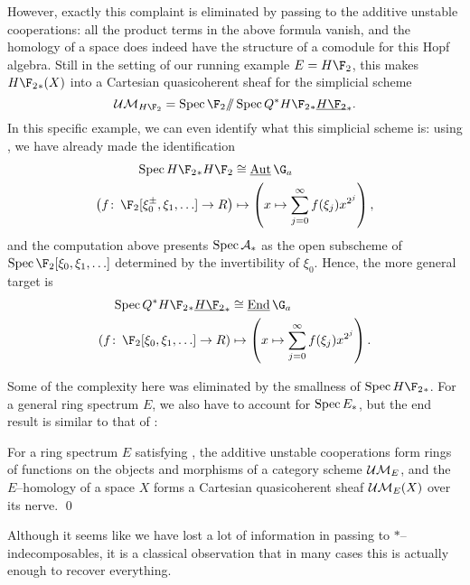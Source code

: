 However, exactly this complaint is eliminated by passing to the additive unstable cooperations: all the product terms in the above formula vanish, and the homology of a space does indeed have the structure of a comodule for this Hopf algebra.  Still in the setting of our running example $E = H\F_2$, this makes $H\F_2{}_*(X)$ into a Cartesian quasicoherent sheaf for the simplicial scheme \[\Ucontext{H\F_2} = \Spec \F_2 \mmod \Spec Q^* H\F_2{}_* \OS{H\F_2}{*}.\]  In this specific example, we can even identify what this simplicial scheme is: using , we have already made the identification
\begin{align*}
\Spec H\F_2{}_* H\F_2 & \cong \InternalAut{\G_a} \\
\left(f\co \F_2[\xi_0^\pm, \xi_1, \ldots] \to R \right) & \mapsto \left(x \mapsto \sum_{j=0}^\infty f(\xi_j) x^{2^j}\right),
\end{align*}
and the computation above presents $\operatorname{Spec} \mathcal A_*$ as the open subscheme of $\Spec \F_2[\xi_0, \xi_1, \ldots]$ determined by the invertibility of $\xi_0$.  Hence, the more general target is
\begin{align*}
\Spec Q^* H\F_2{}_* \OS{H\F_2}{*} & \cong \InternalEnd{\G_a} \\
\left(f\co \F_2[\xi_0, \xi_1, \ldots] \to R \right) & \mapsto \left(x \mapsto \sum_{j=0}^\infty f(\xi_j) x^{2^j}\right).
\end{align*}

Some of the complexity here was eliminated by the smallness of $\Spec H\F_2{}_*$.  For a general ring spectrum $E$, we also have to account for $\operatorname{Spec} E_*$, but the end result is similar to that of :
\begin{lemma}
For a ring spectrum $E$ satisfying {\UFH}, the additive unstable cooperations form rings of functions on the objects and morphisms of a category scheme $\mathcal{UM}_{E}$, and the $E$--homology of a space $X$ forms a Cartesian quasicoherent sheaf $\mathcal{UM}_{E}(X)$ over its nerve. \qed
\end{lemma}

Although it seems like we have lost a lot of information in passing to $\ast$--indecomposables, it is a classical observation that in many cases this is actually enough to recover everything.  

